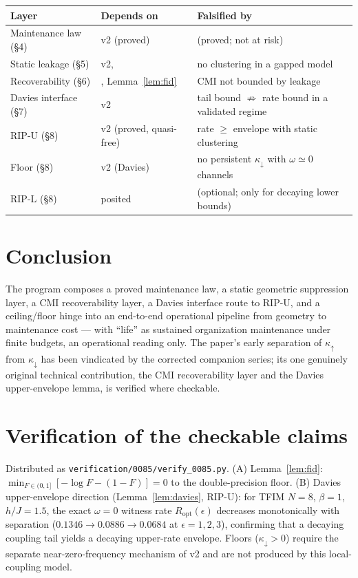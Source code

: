 \documentclass[11pt,a4paper]{article}
\theoremstyle{plain}
\theoremstyle{definition}
\theoremstyle{remark}
\newcommand{\eps}{\epsilon}
\newcommand{\kup}{\kappa_{\uparrow}}
\newcommand{\kdn}{\kappa_{\downarrow}}
\begin{document}
\begin{center}
\small
\begin{tabular}{lll}
\hline
Layer & Depends on & Falsified by\\
\hline
Maintenance law (\S4) & \cite{Work} v2 (proved) & (proved; not at risk)\\
Static leakage (\S5) & \cite{Clustering} v2, \cite{NIST} & no clustering in
a gapped model\\
Recoverability (\S6) & \cite{FawziRenner15}, Lemma~\ref{lem:fid} & CMI not
bounded by leakage\\
Davies interface (\S7) & \cite{DaviesCore} v2 & tail bound $\not\Rightarrow$
rate bound in a validated regime\\
RIP-U (\S8) & \cite{HCut} v2 (proved, quasi-free) & rate $\ge$ envelope with
static clustering\\
Floor (\S8) & \cite{Stress} v2 (Davies) & no persistent $\kdn$ with
$\omega\simeq0$ channels\\
RIP-L (\S8) & posited & (optional; only for decaying lower bounds)\\
\hline
\end{tabular}
\end{center}

\section{Conclusion}

The program composes a proved maintenance law, a static geometric suppression
layer, a CMI recoverability layer, a Davies interface route to RIP-U, and a
ceiling/floor hinge into an end-to-end operational pipeline from geometry to
maintenance cost --- with ``life'' as sustained organization maintenance under
finite budgets, an operational reading only. The paper's early separation of
$\kup$ from $\kdn$ has been vindicated by the corrected companion series; its
one genuinely original technical contribution, the CMI recoverability layer
and the Davies upper-envelope lemma, is verified where checkable.

\appendix

\section{Verification of the checkable claims}\label{app:verif}

Distributed as \texttt{verification/0085/verify\_0085.py}. (A)
Lemma~\ref{lem:fid}: $\min_{F\in(0,1]}[-\log F - (1-F)] = 0$ to the
double-precision floor. (B) Davies upper-envelope direction
(Lemma~\ref{lem:davies}, RIP-U): for TFIM $N=8$, $\beta=1$, $h/J=1.5$, the
exact $\omega=0$ witness rate $R_{\mathrm{opt}}(\eps)$ decreases monotonically
with separation ($0.1346 \to 0.0886 \to 0.0684$ at $\eps = 1,2,3$),
confirming that a decaying coupling tail yields a decaying upper-rate
envelope. Floors ($\kdn > 0$) require the separate near-zero-frequency
mechanism of \cite{Stress} v2 and are not produced by this local-coupling
model.
\end{document}
